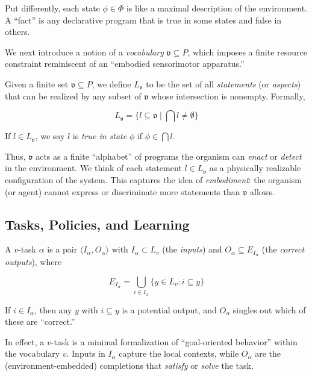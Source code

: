 \documentclass[12pt]{article}
\begin{document}
Put differently, each state $\phi \in \Phi$ is like a maximal description of the environment. A ``fact'' is any declarative program that is true in some states and false in others.

We next introduce a notion of a \textit{vocabulary} $\mathfrak{v} \subseteq P$, which imposes a finite resource constraint reminiscent of an ``embodied sensorimotor apparatus.''  

\begin{definition}
Given a finite set $\mathfrak{v} \subseteq P$, we define $L_{\mathfrak{v}}$ to be the set of all \textit{statements} (or \textit{aspects}) that can be realized by any subset of $\mathfrak{v}$ whose intersection is nonempty. Formally,

\[
   L_\mathfrak{v} = \{ l \subseteq \mathfrak{v} \mid \bigcap l \neq \emptyset \}
\]

If $l \in L_\mathfrak{v}$, we say $l$ is \textit{true in state} $\phi$ if $\phi \in \bigcap l$.
\end{definition}

Thus, $\mathfrak{v}$ acts as a finite ``alphabet'' of programs the organism can \textit{enact} or \textit{detect} in the environment. We think of each statement $l \in L_{\mathfrak{v}}$ as a physically realizable configuration of the system. This captures the idea of \textit{embodiment}: the organism (or agent) cannot express or discriminate more statements than $\mathfrak{v}$ allows.

\subsection{Tasks, Policies, and Learning}

\begin{definition}[$v$-Task]
A $v$-task $\alpha$ is a pair $\langle I_\alpha, O_\alpha\rangle$ with $I_\alpha \subset L_v$ (the \textit{inputs}) and $O_\alpha \subseteq E_{I_\alpha}$ (the \textit{correct outputs}), where 

\[
   E_{I_\alpha} = \bigcup_{i \in I_\alpha} \{y \in L_v : i \subseteq y\}
\]

If $i \in I_\alpha$, then any $y$ with $i \subseteq y$ is a potential output, and $O_\alpha$ singles out which of these are ``correct.''
\end{definition}

In effect, a $v$-task is a minimal formalization of ``goal-oriented behavior'' within the vocabulary $v$. Inputs in $I_\alpha$ capture the local contexts, while $O_\alpha$ are the (environment-embedded) completions that \textit{satisfy} or \textit{solve} the task.
\end{document}
